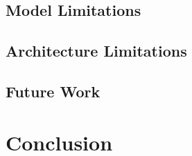 \documentclass[openany]{book}
\numberwithin{figure}{chapter}
\numberwithin{equation}{chapter}
\begin{document}
\section{Model Limitations}

\section{Architecture Limitations}

\section{Future Work}

\chapter{Conclusion}
%

\newpage
%
{}

\end{document}
